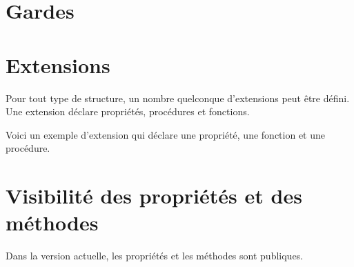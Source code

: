\section{Gardes}







\section{Extensions}

Pour tout type de structure, un nombre quelconque d'extensions peut être défini. Une extension déclare propriétés, procédures et fonctions.

Voici un exemple d'extension qui déclare une propriété, une fonction et une procédure.







\section{Visibilité des propriétés et des méthodes}

Dans la version actuelle, les propriétés et les méthodes sont publiques.


